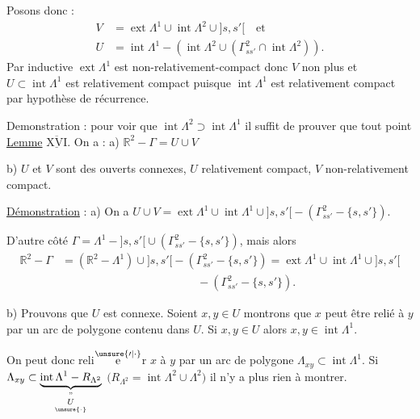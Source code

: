 Posons donc :
\[
\begin{aligned}
V&=\operatorname{ext}\Lambda^1\cup\operatorname{int}\Lambda^2\cup{]s,s'[}\quad\text{et}\\
U&=\operatorname{int}\Lambda^1-(\operatorname{int}\Lambda^2\cup(\Gamma^2_{ss'}\cap\operatorname{int}\Lambda^2)).
\end{aligned}
\]
Par  inductive $\operatorname{ext}\Lambda^1$ est non-relativement-compact donc $V$ non plus et $U\subset\operatorname{int}\Lambda^1$ est relativement compact puisque $\operatorname{int}\Lambda^1$ est relativement compact par hypothèse de récurrence.

Demonstration : pour voir que $\operatorname{int}\Lambda^2\supset\operatorname{int}\Lambda^1$ il suffit de prouver que tout point 
\uline{Lemme} $\underline{\overline{\mathrm{XVI}}}$. On a : a) $\mathbb R^2-\Gamma=U\cup V$

b) $U$ et $V$ sont des ouverts connexes, $U$ relativement compact, $V$ non-relativement compact.

\uline{Démonstration} : a) On a $U\cup V=\operatorname{ext}\Lambda^1\cup\operatorname{int}\Lambda^1\cup{]s,s'[}-(\Gamma^2_{ss'}-\{s,s'\})$.

D'autre côté $\Gamma=\Lambda^1-{]s,s'[}\cup(\Gamma^2_{ss'}-\{s,s'\})$, mais alors
\[
\begin{aligned}
\mathbb R^2-\Gamma&=(\mathbb R^2-\Lambda^1)\cup{]s,s'[}-(\Gamma^2_{ss'}-\{s,s'\})=\operatorname{ext}\Lambda^1\cup\operatorname{int}\Lambda^1\cup{]s,s'[}\\
&\hspace{12em}-(\Gamma^2_{ss'}-\{s,s'\}).
\end{aligned}
\]

b) Prouvons que $U$ est connexe. Soient $x,y\in U$\unsure{;|,} montrons que $x$ peut être relié à $y$ par un arc de polygone contenu dans $U$. Si $x,y\in U$ alors $x,y\in\operatorname{int}\Lambda^1$.

On peut donc reli$\overset{\unsure{\prime|\cdot}}{\text{e}}$r $x$ à $y$ par un arc de polygone $\Lambda_{xy}\subset\operatorname{int}\Lambda^1$. Si $\Lambda_{xy}\subset\underbrace{\operatorname{int}\Lambda^1-R_{\Lambda^2}}_{\substack{\text{''}\\\underset{\unsure{\cdot}}{U}}}$ $\bigl(R_{\Lambda^2}=\operatorname{int}\Lambda^2\cup\Lambda^2\bigr)$ il n'y a plus rien à montrer.

